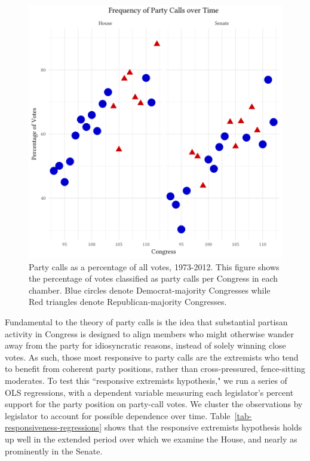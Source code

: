 \documentclass[12pt]{article}
\begin{document}
\begin{figure}[p]
\centering
\includegraphics[width = \textwidth]{party_call_percent_both.pdf}
\caption{Party calls as a percentage of all votes, 1973-2012.
This figure shows the percentage of votes classified as party calls per Congress in each chamber. Blue circles denote Democrat-majority Congresses while Red triangles denote Republican-majority Congresses.
\label{fig-party-calls-over-time}}
\end{figure}

Fundamental to the theory of party calls is the idea that substantial partisan activity in Congress is designed to align members who might otherwise wander away from the party for idiosyncratic reasons, instead of solely winning close votes. As such, those most responsive to party calls are the extremists who tend to benefit from coherent party positions, rather than cross-pressured, fence-sitting moderates. To test this ``responsive extremists hypothesis," we run a series of OLS regressions, with a dependent variable measuring each legislator's percent support for the party position on party-call votes. We cluster the observations by legislator to account for possible dependence over time. Table~\ref{tab-responsiveness-regressions} shows that the responsive extremists hypothesis holds up well in the extended period over which we examine the House, and nearly as prominently in the Senate.
\end{document}

